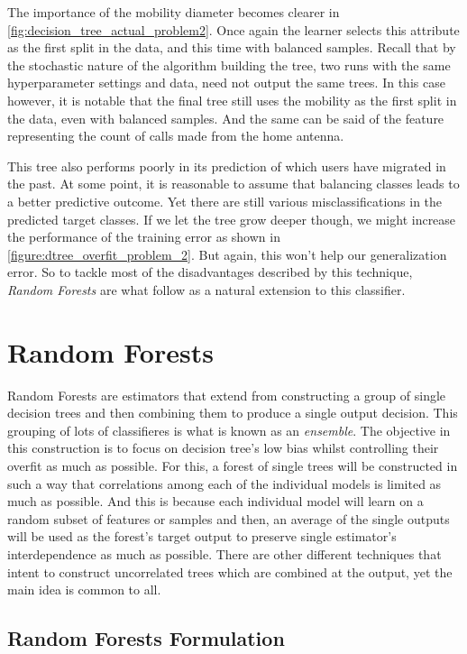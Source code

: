 \smallskip

The importance of the mobility diameter becomes clearer in \cref{fig:decision_tree_actual_problem2}.
Once again the learner selects this attribute as the first split in the data, and this time with balanced samples.
Recall that by the stochastic nature of the algorithm building the tree, two runs with the same hyperparameter settings and data, need not output the same trees.
In this case however, it is notable that the final tree still uses the mobility as the first split in the data, even with balanced samples.
And the same can be said of the feature representing the count of calls made from the home antenna.

This tree also performs poorly in its prediction of which users have migrated in the past.
At some point, it is reasonable to assume that balancing classes leads to a better predictive outcome.
Yet there are still various misclassifications in the predicted target classes.
If we let the tree grow deeper though, we might increase the performance of the training error as shown in \cref{figure:dtree_overfit_problem_2}.
But again, this won't help our generalization error.
So to tackle most of the disadvantages described by this technique, \textit{Random Forests} are what follow as a natural extension to this classifier.


\section{ Random Forests}\label{section:random_forests}

Random Forests are estimators that extend from constructing a group of single decision trees and then combining them to produce a single output decision.
This grouping of lots of classifieres is what is known as an \textit{ensemble}.
The objective in this construction is to focus on decision tree's low bias whilst controlling their overfit as much as possible.
For this, a forest of single trees will be constructed in such a way that correlations among each of the individual models is limited as much as possible.
And this is because each individual model will learn on a random subset of features or samples and then, an average of the single outputs will be used as the forest's target output to preserve single estimator's interdependence as much as possible.
There  are other different techniques that intent to construct uncorrelated trees which are combined at the output, yet the main idea is common to all.

\subsection{ Random Forests Formulation}\label{subsection:random_forests_formulation}

